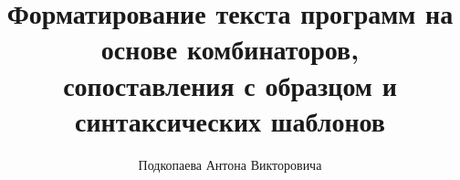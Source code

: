 \title{Форматирование текста программ на основе комбинаторов,\\
сопоставления с образцом и синтаксических шаблонов}
%
\author{Подкопаева Антона Викторовича}
%
%
%

\maketitle              %

\begin{abstract}
\end{abstract}
%







